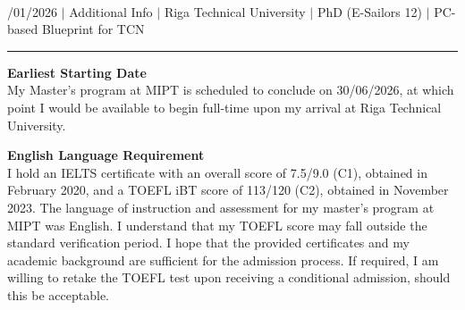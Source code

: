 \documentclass[a4paper,12pt]{article}
\begin{document}
{\centering
  {\scshape {}} \\ 
  {\fontsize{10}{10}/01/2026} $|$
  {\fontsize{10}{10}\selectfont Additional Info} $|$
  {\fontsize{10}{10}\selectfont Riga Technical University} $|$
  {\fontsize{10}{10}\selectfont PhD (E-Sailors 12)} $|$
  {\fontsize{10}{10}\selectfont PC-based Blueprint for TCN}
\par}
\vspace{-20pt}
\noindent\rule{\textwidth}{0.5pt}

\vspace{-10pt}

\noindent \textbf{Earliest Starting Date}\\
My Master's program at MIPT is scheduled to conclude on 30/06/2026, at which point I would be available to begin full-time upon my arrival at Riga Technical University.

\noindent \textbf{English Language Requirement}\\
I hold an IELTS certificate with an overall score of 7.5/9.0 (C1), obtained in February 2020, and a TOEFL iBT score of 113/120 (C2), obtained in November 2023. The language of instruction and assessment for my master’s program at MIPT was English. I understand that my TOEFL score may fall outside the standard verification period. I hope that the provided certificates and my academic background are sufficient for the admission process. If required, I am willing to retake the TOEFL test upon receiving a conditional admission, should this be acceptable.
\end{document}
